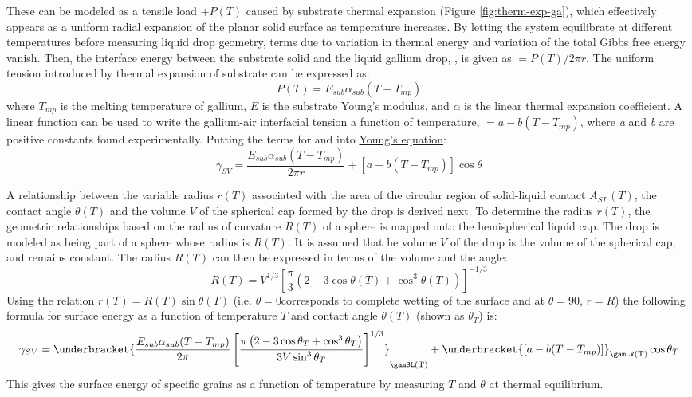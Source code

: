 These can be modeled as a tensile load +$P(T)$ caused by substrate thermal expansion (Figure \ref{fig:therm-exp-ga}), which effectively appears as a uniform radial expansion of the planar solid surface as temperature increases. By letting the system equilibrate at different temperatures before measuring liquid drop geometry, terms due to variation in thermal energy and variation of the total Gibbs free energy vanish. Then, the interface energy between the substrate solid and the liquid gallium drop, \gamSL, is given as \gamSL$=P(T)/2\pi r$. The uniform tension introduced by thermal expansion of substrate can be expressed as:
\begin{equation}\label{uniform-tension}
	P(T) = E_{sub}\alpha_{sub}(T-T_{mp})
\end{equation}
where $T_{mp}$ is the melting temperature of gallium, $E$  is the substrate Young’s modulus, and $\alpha$ is the linear thermal expansion coefficient. A linear function can be used to write the gallium-air interfacial tension a function of temperature, \gamLV $= a-b(T-T_{mp})$, where \textit{a} and \textit{b} are positive constants found experimentally.\cite{Hardy1985,Alchagirov2005} Putting the terms for \gamSL and \gamSV into \hyperlink{youngeqn}{Young’s equation}\cite{Rudawska2009,Tadmor2004}:
\begin{equation*}%
	\gamma_{SV} =  \frac{E_{sub}\alpha_{sub}(T-T_{mp})}{2\pi r} + \left[a-b(T-T_{mp})\right]\cos\theta
\end{equation*}

A relationship between the variable radius $r(T)$ associated with the area of the circular region of solid-liquid contact $A_{SL}(T)$, the contact angle $\theta(T)$ and the volume $V$ of the spherical cap formed by the drop is derived next. To determine the radius $r(T)$, the geometric relationships based on the radius of curvature $R(T)$ of a sphere is mapped onto the hemispherical liquid cap. The drop is modeled as being part of a sphere whose radius is $R(T)$. It is assumed that he volume $V$ of the drop is the volume of the spherical cap, and remains constant. The radius $R(T)$ can then be expressed in terms of the volume and the angle:
\begin{equation*}\label{drop-geom}
	R(T) = V^{1/3} \left[\frac{\pi}{3} \left(2-3\cos\theta(T)+\cos^{3}\theta(T)\right)\right]^{-1/3}
\end{equation*}
Using the relation $r(T)=R(T)\sin\theta(T)$ (i.e. $\theta=$0\degree corresponds to complete wetting of the surface and at $\theta=90$\degree,  $r=R$) the following formula for surface energy as a function of temperature $T$ and contact angle $\theta(T)$ (shown as $\theta_{T}$) is:
\begin{equation}\label{youngs-eqn-ga}
	\gamma_{SV} =  \underbracket{\frac{E_{sub}\alpha_{sub}(T-T_{mp})}{2\pi}\left[\frac{\pi\left(2-3\cos\theta_{T}+\cos^{3}\theta_{T}\right)}{3V\sin^{3}\theta_{T}} \right]^{1/3}}_{\text{\gamSL(T)}} + \underbracket{\left[a-b(T-T_{mp})\right]}_{\text{\gamLV(T)}} \cos\theta_{T}
\end{equation}
This gives the surface energy \gamSV of specific grains as a function of temperature by measuring $T$ and $\theta$ at thermal equilibrium.


